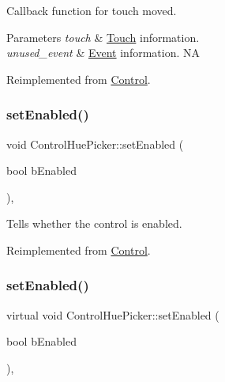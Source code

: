 Callback function for touch moved.


\begin{DoxyParams}{Parameters}
{\em touch} & \hyperlink{classTouch}{Touch} information. \\
\hline
{\em unused\+\_\+event} & \hyperlink{classEvent}{Event} information.  NA \\
\hline
\end{DoxyParams}


Reimplemented from \hyperlink{classControl_a26d2e6af053319dc605949678f726622}{Control}.

\mbox{\label{classControlHuePicker_a45c6330610f27124057f4d69b37abc9b}} 
\subsubsection{\texorpdfstring{set\+Enabled()}{setEnabled()}\hspace{0.1cm}{\footnotesize\ttfamily [1/2]}}
{\footnotesize\ttfamily void Control\+Hue\+Picker\+::set\+Enabled (\begin{DoxyParamCaption}\item[{bool}]{b\+Enabled }\end{DoxyParamCaption})\hspace{0.3cm}{\ttfamily [override]}, {\ttfamily [virtual]}}

Tells whether the control is enabled. 

Reimplemented from \hyperlink{classControl_a55339ae920182245d5ec114c33f4b1fd}{Control}.

\mbox{\label{classControlHuePicker_a2e6169e815f3ee9fa83f00f9e20f7292}} 
\subsubsection{\texorpdfstring{set\+Enabled()}{setEnabled()}\hspace{0.1cm}{\footnotesize\ttfamily [2/2]}}
{\footnotesize\ttfamily virtual void Control\+Hue\+Picker\+::set\+Enabled (\begin{DoxyParamCaption}\item[{bool}]{b\+Enabled }\end{DoxyParamCaption})\hspace{0.3cm}{\ttfamily [override]}, {\ttfamily [virtual]}}

